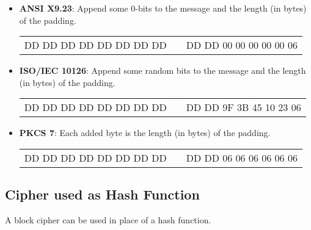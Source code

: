\begin{itemize}
    \item \textbf{ANSI X9.23}: Append some 0-bits to the message and the
        length (in bytes) of the padding.
                \begin{center}
                    \begin{tabular}{|c|c|c|}
                        \cline{1-1} \cline{3-3}
                        DD DD DD DD DD DD DD DD & & DD DD
                        \textcolor{red!50!black}{00 00 00 00 00}
                        \textcolor{green!50!black}{06}\\
                        \cline{1-1} \cline{3-3}
                    \end{tabular}
                \end{center}

    \item \textbf{ISO/IEC 10126}: Append some random bits to the message
        and the length (in bytes) of the padding.
                \begin{center}
                    \begin{tabular}{|c|c|c|}
                        \cline{1-1} \cline{3-3}
                        DD DD DD DD DD DD DD DD & & DD DD
                        \textcolor{red!50!black}{9F 3B 45 10 23}
                        \textcolor{green!50!black}{06}\\
                        \cline{1-1} \cline{3-3}
                    \end{tabular}
                \end{center}

    \item \textbf{PKCS 7}: Each added byte is the length (in bytes) of the padding.
                \begin{center}
                    \begin{tabular}{|c|c|c|}
                        \cline{1-1} \cline{3-3}
                        DD DD DD DD DD DD DD DD & & DD DD
                        \textcolor{red!50!black}{06 06 06 06 06 06}\\
                        \cline{1-1} \cline{3-3}
                    \end{tabular}
                \end{center}
\end{itemize}

\subsection{Cipher used as Hash Function}
A block cipher can be used in place of a hash function.

